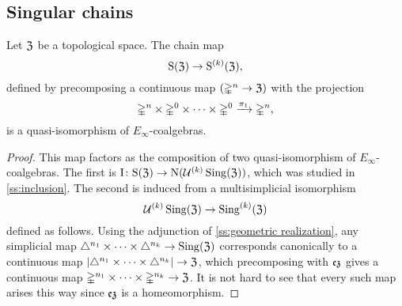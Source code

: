 \subsection{Singular chains}\label{ss:singular}

\begin{theorem*}
	Let $\mathfrak{Z}$ be a topological space.
	The chain map
	\[
	\mathrm{S}(\mathfrak{Z}) \to \mathrm{S}^{(k)}(\mathfrak{Z}),
	\]
	defined by precomposing a continuous map $(\mathbb{\Delta}^n \to \mathfrak{Z})$ with the projection
	\[
	\mathbb{\Delta}^n \times \mathbb{\Delta}^{0}\times\dots\times\mathbb{\Delta}^{0} \xrightarrow{\pi_1} \mathbb{\Delta}^n,
	\]
	is a quasi-isomorphism of $E_\infty$-coalgebras.
\end{theorem*}

\begin{proof}
	This map factors as the composition of two quasi-isomorphism of $E_\infty$-coalgebras.
	The first is $\operatorname{I} \colon \mathrm{S}(\mathfrak{Z}) \to \operatorname{N}(\mathcal{U}^{(k)} \operatorname{Sing}(\mathfrak{Z}))$, which was studied in \cref{ss:inclusion}.
	The second is induced from a multisimplicial isomorphism
	\[
	\mathcal{U}^{(k)} \operatorname{Sing}(\mathfrak{Z}) \to \operatorname{Sing}^{(k)}(\mathfrak{Z})
	\]
	defined as follows.
	Using the adjunction of \cref{ss:geometric realization}, any simplicial map $\triangle^{n_1}\times\dots\times\triangle^{n_k} \to \operatorname{Sing}(\mathfrak{Z})$ corresponds canonically to a continuous map $\lvert\triangle^{n_1}\times\dots\times\triangle^{n_k}\rvert \to \mathfrak{Z}$, which precomposing with $\operatorname{\mathfrak{ez}}$ gives a continuous map $\mathbb{\Delta}^{n_1}\times\dots\times\mathbb{\Delta}^{n_k} \to \mathfrak{Z}$.
	It is not hard to see that every such map arises this way since $\operatorname{\mathfrak{ez}}$ is a homeomorphism.
\end{proof}